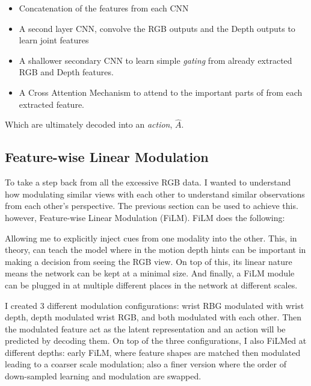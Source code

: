 \begin{itemize}
  \item Concatenation of the features from each CNN 
  \item A second layer CNN, convolve the RGB outputs and the Depth outputs to learn joint features 
  \item A shallower secondary CNN to learn simple \emph{gating} from already extracted RGB and Depth features. 
  \item A Cross Attention Mechanism to attend to the important parts of from each extracted feature.
\end{itemize}
Which are ultimately decoded into an \emph{action}, $\hat{A}$.

\subsection{Feature-wise Linear Modulation}
To take a step back from all the excessive RGB data. I wanted to understand how modulating similar views with each other to understand similar observations from each other's perspective. The previous section can be used to achieve this. however, Feature-wise Linear Modulation (FiLM). FiLM does the following: 


Allowing me to explicitly inject cues from one modality into the other. This, in theory, can teach the model where in the motion depth hints can be important in making a decision from seeing the RGB view. On top of this, its linear nature means the network can be kept at a minimal size. And finally, a FiLM module can be plugged in at multiple different places in the network at different scales. 

I created 3 different modulation configurations: wrist RBG modulated with wrist depth, depth modulated wrist RGB, and both modulated with each other. Then the modulated feature act as the latent representation and an action will be predicted by decoding them. On top of the three configurations, I also FiLMed at different depths: early FiLM, where feature shapes are matched then modulated leading to a coarser scale modulation; also a finer version where the order of down-sampled learning and modulation are swapped.


